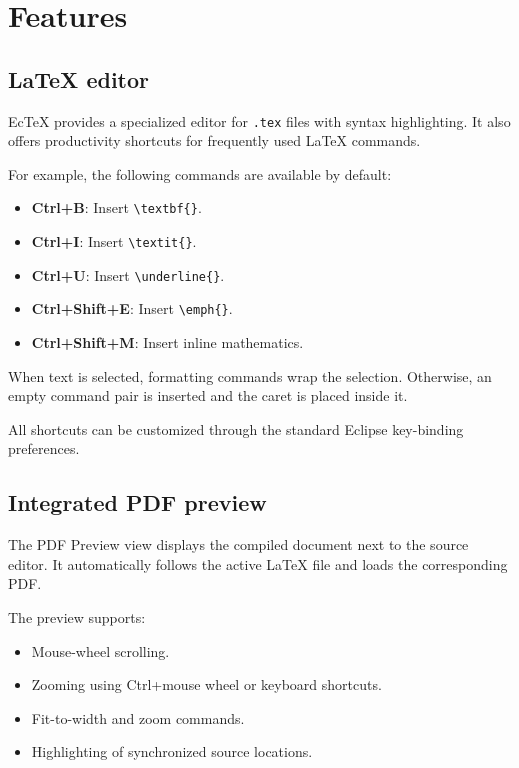 \section{Features}

\subsection{LaTeX editor}

EcTeX provides a specialized editor for \texttt{.tex} files
with syntax highlighting. It also offers productivity
shortcuts for frequently used LaTeX commands.

For example, the following commands are available by
default:

\begin{itemize}[noitemsep]
    \item \textbf{Ctrl+B}: Insert \verb|\textbf{}|.
    \item \textbf{Ctrl+I}: Insert \verb|\textit{}|.
    \item \textbf{Ctrl+U}: Insert \verb|\underline{}|.
    \item \textbf{Ctrl+Shift+E}: Insert \verb|\emph{}|.
    \item \textbf{Ctrl+Shift+M}: Insert inline mathematics.
\end{itemize}

When text is selected, formatting commands wrap the
selection. Otherwise, an empty command pair is inserted
and the caret is placed inside it.

All shortcuts can be customized through the standard
Eclipse key-binding preferences.

\subsection{Integrated PDF preview}

The PDF Preview view displays the compiled document
next to the source editor. It automatically follows the
active LaTeX file and loads the corresponding PDF.

The preview supports:
\begin{itemize}[noitemsep]
    \item Mouse-wheel scrolling.
    \item Zooming using Ctrl+mouse wheel or keyboard
    shortcuts.
    \item Fit-to-width and zoom commands.
    \item Highlighting of synchronized source locations.
\end{itemize}

